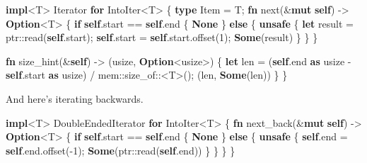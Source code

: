 \documentclass[a4paper,]{book}
\newenvironment{Shaded}{\begin{snugshade}}{\end{snugshade}}
\newcommand{\KeywordTok}[1]{\textcolor[rgb]{0.13,0.29,0.53}{\textbf{{#1}}}}
\newcommand{\DecValTok}[1]{\textcolor[rgb]{0.00,0.00,0.81}{{#1}}}
\newcommand{\NormalTok}[1]{{#1}}
\begin{document}
\begin{Shaded}
\begin{Highlighting}[]
\KeywordTok{impl}\NormalTok{<T> Iterator }\KeywordTok{for} \NormalTok{IntoIter<T> \{}
    \KeywordTok{type} \NormalTok{Item = T;}
    \KeywordTok{fn} \NormalTok{next(&}\KeywordTok{mut} \KeywordTok{self}\NormalTok{) -> }\KeywordTok{Option}\NormalTok{<T> \{}
        \KeywordTok{if} \KeywordTok{self}\NormalTok{.start == }\KeywordTok{self}\NormalTok{.end \{}
            \KeywordTok{None}
        \NormalTok{\} }\KeywordTok{else} \NormalTok{\{}
            \KeywordTok{unsafe} \NormalTok{\{}
                \KeywordTok{let} \NormalTok{result = ptr::read(}\KeywordTok{self}\NormalTok{.start);}
                \KeywordTok{self}\NormalTok{.start = }\KeywordTok{self}\NormalTok{.start.offset(}\DecValTok{1}\NormalTok{);}
                \KeywordTok{Some}\NormalTok{(result)}
            \NormalTok{\}}
        \NormalTok{\}}
    \NormalTok{\}}

    \KeywordTok{fn} \NormalTok{size_hint(&}\KeywordTok{self}\NormalTok{) -> (usize, }\KeywordTok{Option}\NormalTok{<usize>) \{}
        \KeywordTok{let} \NormalTok{len = (}\KeywordTok{self}\NormalTok{.end }\KeywordTok{as} \NormalTok{usize - }\KeywordTok{self}\NormalTok{.start }\KeywordTok{as} \NormalTok{usize)}
                  \NormalTok{/ mem::size_of::<T>();}
        \NormalTok{(len, }\KeywordTok{Some}\NormalTok{(len))}
    \NormalTok{\}}
\NormalTok{\}}
\end{Highlighting}
\end{Shaded}

And here's iterating backwards.

\begin{Shaded}
\begin{Highlighting}[]
\KeywordTok{impl}\NormalTok{<T> DoubleEndedIterator }\KeywordTok{for} \NormalTok{IntoIter<T> \{}
    \KeywordTok{fn} \NormalTok{next_back(&}\KeywordTok{mut} \KeywordTok{self}\NormalTok{) -> }\KeywordTok{Option}\NormalTok{<T> \{}
        \KeywordTok{if} \KeywordTok{self}\NormalTok{.start == }\KeywordTok{self}\NormalTok{.end \{}
            \KeywordTok{None}
        \NormalTok{\} }\KeywordTok{else} \NormalTok{\{}
            \KeywordTok{unsafe} \NormalTok{\{}
                \KeywordTok{self}\NormalTok{.end = }\KeywordTok{self}\NormalTok{.end.offset(-}\DecValTok{1}\NormalTok{);}
                \KeywordTok{Some}\NormalTok{(ptr::read(}\KeywordTok{self}\NormalTok{.end))}
            \NormalTok{\}}
        \NormalTok{\}}
    \NormalTok{\}}
\NormalTok{\}}
\end{Highlighting}
\end{Shaded}
\end{document}
